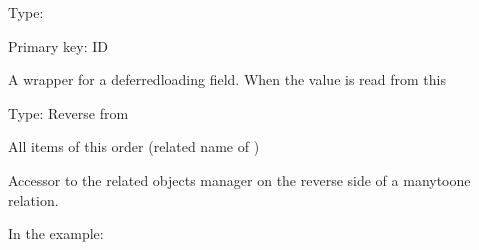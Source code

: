 \documentclass[letterpaper,10pt,russian]{sphinxmanual}
\begin{document}
\begin{fulllineitems}
\begin{fulllineitems}
\end{fulllineitems}


\begin{fulllineitems}
\label{\detokenize{myapp:polls.models.Order.id}}
\pysigstartsignatures
\pysigline
{}
\pysigstopsignatures
\sphinxAtStartPar
Type: 

\sphinxAtStartPar
Primary key: ID

\sphinxAtStartPar
A wrapper for a deferred\sphinxhyphen{}loading field. When the value is read from this

\end{fulllineitems}


\begin{fulllineitems}
\label{\detokenize{myapp:polls.models.Order.items}}
\pysigstartsignatures
\pysigline
{}
\pysigstopsignatures
\sphinxAtStartPar
Type: Reverse  from {\hyperref[\detokenize{myapp:polls.models.OrderItem}]{}}

\sphinxAtStartPar
All items of this order (related name of {\hyperref[\detokenize{myapp:polls.models.OrderItem.order}]{}})

\sphinxAtStartPar
Accessor to the related objects manager on the reverse side of a
many\sphinxhyphen{}to\sphinxhyphen{}one relation.

\sphinxAtStartPar
In the example:

\begin{sphinxVerbatim}[commandchars=\\\{\}]
       
\end{sphinxVerbatim}


\end{fulllineitems}
\end{fulllineitems}
\end{document}
